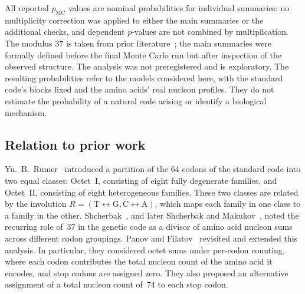 \documentclass[11pt,a4paper]{article}
\renewcommand{\_}{\origunderscore\allowbreak}
\begin{document}
All reported $p_{\mathrm{MC}}$ values are nominal probabilities
for individual summaries: no multiplicity correction was applied
to either the main summaries or the additional checks, and dependent $p$-values
are not combined by multiplication. The modulus $37$ is taken
from prior literature~\cite{shcherbak1993,shcherbak2003,makukov2013,panov2024}; the main summaries were formally defined
before the final Monte Carlo run but after inspection of the
observed structure. The analysis was not preregistered and is
exploratory. The resulting probabilities refer to the models considered here,
with the standard code's blocks fixed and the amino acids'
real nucleon profiles. They do not estimate the probability
of a natural code arising or identify a biological mechanism.

\subsection{Relation to prior work}
\label{sec:discussion-prior-work}

Yu.~B.~Rumer~\cite{rumer1966,rumer1968}
introduced a partition of the $64$ codons of the standard code
into two equal classes: Octet~I,
consisting of eight fully degenerate families, and
Octet~II, consisting of eight heterogeneous families.
These two classes are related by the involution
$R = (\mathrm{T} \leftrightarrow \mathrm{G},
\mathrm{C} \leftrightarrow \mathrm{A})$, which maps
each family in one class to a family in the other.
Shcherbak~\cite{shcherbak1993,shcherbak2003}, and later Shcherbak and Makukov~\cite{makukov2013},
noted the recurring role of~$37$ in the genetic code
as a divisor of amino acid nucleon sums across different
codon groupings. Panov and Filatov~\cite{panov2024}
revisited and extended this analysis. In particular,
they considered octet sums under per-codon counting,
where each codon contributes the total nucleon count of
the amino acid it encodes, and stop codons are assigned zero.
They also proposed an alternative assignment of
a total nucleon count of~$74$ to each stop codon.
\end{document}
